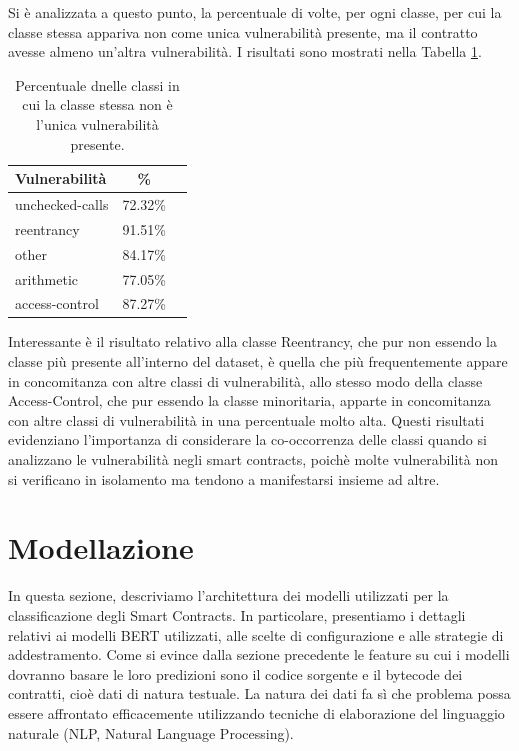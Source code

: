 \documentclass[../../Thesis.tex]{subfiles}
\begin{document}
Si \`e analizzata a questo punto, la percentuale di volte, per ogni classe, per cui la classe stessa appariva non come unica vulnerabilit\`a presente, ma il contratto avesse almeno un'altra vulnerabilit\`a. I risultati sono mostrati nella Tabella \ref{tab:multi_vuln}.

\begin{table}[h!]
    \centering
    \begin{tabular}{|l|c|c|}
        \hline
        \textbf{Vulnerabilit\`a} & \textbf{\%} \\
        \hline
        unchecked-calls  & 72.32\% \\
        reentrancy  & 91.51\% \\
        other  & 84.17\% \\
        arithmetic  & 77.05\% \\
        access-control  & 87.27\% \\

        \hline
    \end{tabular}
    \caption{Percentuale dnelle classi in cui la classe stessa non \`e l'unica vulnerabilit\`a presente.}
    \label{tab:multi_vuln}
\end{table}
Interessante \`e il risultato relativo alla classe Reentrancy, che pur non essendo la classe pi\`u presente all'interno del dataset, \`e quella che pi\`u frequentemente appare in concomitanza con altre classi di vulnerabilit\`a, allo stesso modo della classe Access-Control, che pur essendo la classe minoritaria, apparte in concomitanza con altre classi di vulnerabilit\`a in una percentuale molto alta.
Questi risultati evidenziano l'importanza di considerare la co-occorrenza delle classi quando si analizzano le vulnerabilit\`a negli smart contracts, poich\`e molte vulnerabilit\`a non si verificano in isolamento ma tendono a manifestarsi insieme ad altre.


\section{Modellazione}
In questa sezione, descriviamo l'architettura dei modelli utilizzati per la classificazione degli Smart Contracts. In particolare, presentiamo i dettagli relativi ai modelli BERT utilizzati, alle scelte di configurazione e alle strategie di addestramento.
Come si evince dalla sezione precedente le feature su cui i modelli dovranno basare le loro predizioni sono il codice sorgente e il bytecode dei contratti, cio\`e dati di natura testuale. La natura dei dati fa s\`i che problema possa essere affrontato efficacemente utilizzando tecniche di elaborazione del linguaggio naturale (NLP, Natural Language Processing).
\end{document}
